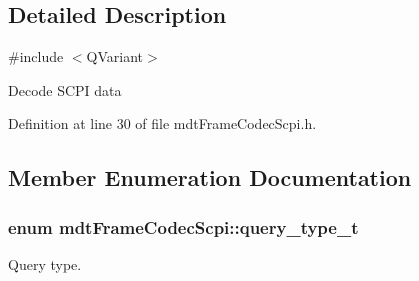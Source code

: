 \subsection{Detailed Description}
\#include $<$\-Q\-Variant$>$ 

Decode S\-C\-P\-I data 

Definition at line 30 of file mdt\-Frame\-Codec\-Scpi.\-h.



\subsection{Member Enumeration Documentation}
\hypertarget{classmdt_frame_codec_scpi_a2dbce7589140e915f3e253c3523b3b9a}{
\subsubsection[{query\-\_\-type\-\_\-t}]{\setlength{\rightskip}{0pt plus 5cm}enum {\bf mdt\-Frame\-Codec\-Scpi\-::query\-\_\-type\-\_\-t}}}\label{classmdt_frame_codec_scpi_a2dbce7589140e915f3e253c3523b3b9a}


Query type. 

